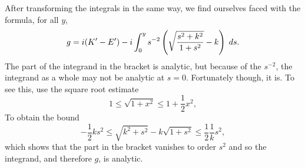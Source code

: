 After transforming the integrals in the same way, we find ourselves faced with the formula, for all $y$,
\[
g = i (K'-E') - i \int_0^y s^{-2}\left( \sqrt{\frac{s^2 + k^2}{1 + s^2}} - k \right)\;ds.
\]
The part of the integrand in the bracket is analytic, but because of the $s^{-2}$, the integrand as a whole may not be analytic at $s=0$. Fortunately though, it is. To see this, use the square root estimate
\[
1 \leq \sqrt {1 + x^2} \leq 1 + \frac{1}{2}x^2,
\]
To obtain the bound
\[
-\frac{1}{2}k s^2 \leq \sqrt{k^2 + s^2} - k \sqrt{1+s^2} \leq \frac{1}{2}\frac{1}{k} s^2,
\]
which shows that the part in the bracket vanishes to order $s^2$ and so the integrand, and therefore $g$, is analytic.

